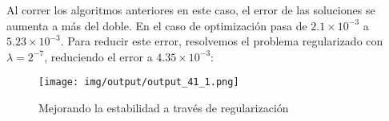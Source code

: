 Al correr los algoritmos anteriores en este caso, el error de las soluciones se aumenta a más del doble. En el caso de optimización pasa de $2.1\times 10^{-3}$ a $5.23\times 10^{-3}$. Para reducir este error, resolvemos el problema regularizado con $\lambda=2^{-7}$, reduciendo el error a $4.35\times 10^{-3}$:

\begin{figure}
    \centering
    \texttt{[image: img/output/output\_41\_1.png]}
    \caption{Mejorando la estabilidad a través de regularización}
    \label{fig:my_label}
\end{figure}

 